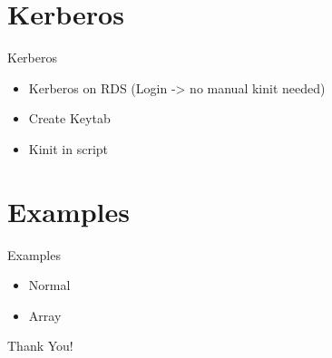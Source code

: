 \documentclass{beamer}
\begin{document}
\section{Kerberos}
\begin{frame}{Kerberos}
	\begin{itemize}
		\item Kerberos on RDS (Login -> no manual kinit needed)
		\item Create Keytab
		\item Kinit in script
	\end{itemize}
\end{frame}

\section{Examples}
\begin{frame}{Examples}
	\begin{itemize}
		\item Normal
		\item Array
	\end{itemize}
\end{frame}
\begin{frame}
    \centering \Large
    Thank You!
\end{frame}
\end{document}
